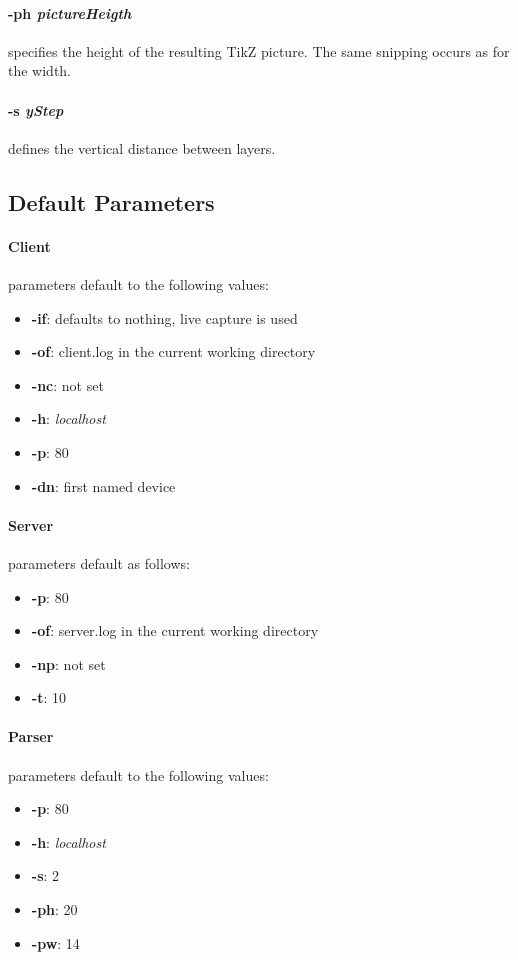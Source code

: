 \paragraph{-ph \textit{pictureHeigth}} specifies the height of the resulting TikZ picture.
The same snipping occurs as for the width.

\paragraph{-s \textit{yStep}} defines the vertical distance between layers.

\subsection*{Default Parameters}
\paragraph{Client} parameters default to the following values:
\begin{itemize}
    \item \textbf{-if}: defaults to nothing, live capture is used
    \item \textbf{-of}: client.log in the current working directory
    \item \textbf{-nc}: not set
    \item \textbf{-h}: \textit{localhost}
    \item \textbf{-p}: 80
    \item \textbf{-dn}: first named device
\end{itemize}

\paragraph{Server} parameters default as follows:
\begin{itemize}
    \item \textbf{-p}: 80
    \item \textbf{-of}: server.log in the current working directory
    \item \textbf{-np}: not set
    \item \textbf{-t}: 10
\end{itemize}

\paragraph{Parser} parameters default to the following values:
\begin{itemize}
    \item \textbf{-p}: 80
    \item \textbf{-h}: \textit{localhost}
    \item \textbf{-s}: 2
    \item \textbf{-ph}: 20
    \item \textbf{-pw}: 14
\end{itemize}

